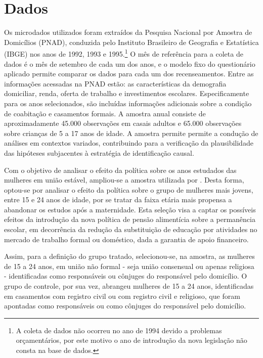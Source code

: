 \documentclass[12pt,oneside,a4paper]{article}
\begin{document}
\section{Dados}

Os microdados utilizados foram extraídos da Pesquisa Nacional por Amostra de Domicílios (PNAD), conduzida pelo Instituto Brasileiro de Geografia e Estatística (IBGE) nos anos de 1992, 1993 e 1995.\footnote{A coleta de dados não ocorreu no ano de 1994 devido a problemas orçamentários, por este motivo o ano de introdução da nova legislação não consta na base de dados.} O mês de referência para a coleta de dados é o mês de setembro de cada um dos anos, e o modelo fixo do questionário aplicado permite comparar os dados para cada um dos recenseamentos. Entre as informações acessadas na PNAD estão: as características da demografia domiciliar, renda, oferta de trabalho e investimentos escolares. Especificamente para os anos selecionados, são incluídas informações adicionais sobre a condição de coabitação e casamentos formais. A amostra anual consiste de aproximadamente 45.000 observações em casais adultos e 65.000 observações sobre crianças de 5 a 17 anos de idade. A amostra permite permite a condução de análises em contextos variados, contribuindo para a verificação da plausibilidade das hipóteses subjacentes à estratégia de identificação causal. 

Com o objetivo de analisar o efeito da política sobre os anos estudados das mulheres em união estável, ampliou-se a amostra utilizada por \cite{rangel2006alimony}. Desta forma, optou-se por analisar o efeito da política sobre o grupo de mulheres mais jovens, entre 15 e 24 anos de idade, por se tratar da faixa etária mais propensa a abandonar os estudos após a maternidade. Esta seleção visa a captar os possíveis efeitos da introdução da nova política de pensão alimentícia sobre a permanência escolar, em decorrência da redução da substituição de educação por atividades no mercado de trabalho formal ou doméstico, dada a garantia de apoio financeiro.

Assim, para a definição do grupo tratado, selecionou-se, na amostra, as mulheres de 15 a 24 anos, em união não formal - seja união consensual ou apenas religiosa - identificadas como responsáveis ou cônjuges do responsável pelo domicílio. O grupo de controle, por sua vez, abrangeu mulheres de 15 a 24 anos, identificadas em casamentos com registro civil ou com registro civil e religioso, que foram apontadas como responsáveis ou como cônjuges do responsável pelo domicílio.  
\end{document}
